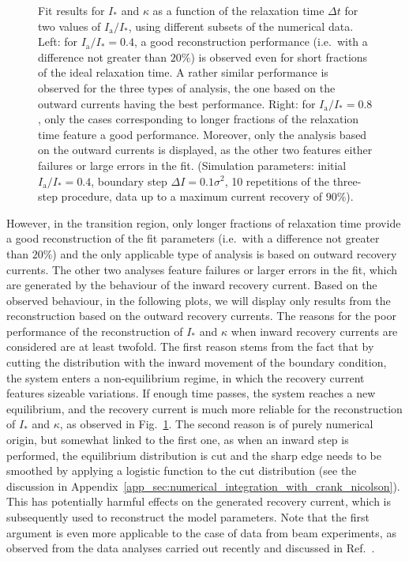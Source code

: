 {\begin{figure}[t]
    \caption{Fit results for $I_\ast$ and $\kappa$ as a function of the relaxation time $\Delta t$ for two values of $I_\mathrm{a}/I_\ast$, using different subsets of the numerical data. Left: for $I_\mathrm{a}/I_\ast=0.4$, a good reconstruction performance  {(i.e.\ with a difference not greater than $20\%$)} is observed even for short fractions of the ideal relaxation time. A rather similar performance is observed for the three types of analysis, the one based on the outward currents having the best performance. Right: for $I_\mathrm{a} / I_\ast=0.8$, only the cases corresponding to longer fractions of the relaxation time feature a good performance. Moreover, only the analysis based on the outward currents is displayed, as the other two features either failures or large errors in the fit. (Simulation parameters: initial $I_\mathrm{a}/I_\ast=0.4$, boundary step $\Delta I =0.1 \sigma^2$, 10 repetitions of the three-step procedure, data up to a maximum current recovery of $90\%$).}
    \label{fig:all_different_time}
\end{figure}
%

However, in the transition region, only longer fractions of relaxation time provide a good reconstruction of the fit parameters  {(i.e.\ with a difference not greater than $20\%$)} and the only applicable type of analysis is based on outward recovery currents. The other two analyses feature failures or larger errors in the fit, {which are generated by the behaviour of the inward recovery current}. Based on the observed behaviour, in the following plots, we will display only results from the reconstruction based on the outward recovery currents. {The reasons for the poor performance of the reconstruction of $I_\ast$ and $\kappa$ when inward recovery currents are considered are at least twofold. The first reason stems from the fact that by cutting the distribution with the inward movement of the boundary condition, the system enters a non-equilibrium regime, in which the recovery current features sizeable variations. If enough time passes, the system reaches a new equilibrium, and the recovery current is much more reliable for the reconstruction of $I_\ast$ and $\kappa$, as observed in Fig.~\ref{fig:all_different_time}. The second reason is of purely numerical origin, but somewhat linked to the first one, as when an inward step is performed, the equilibrium distribution is cut and the sharp edge needs to be smoothed by applying a logistic function to the cut distribution (see the discussion in Appendix~\ref{app_sec:numerical_integration_with_crank_nicolson}). This has potentially harmful effects on the generated recovery current, which is subsequently used to reconstruct the model parameters. Note that the first argument is even more applicable to the case of data from beam experiments, as observed from the data analyses carried out recently and discussed in Ref.~\cite{montanari:ipac22-mopost043}.}

}
